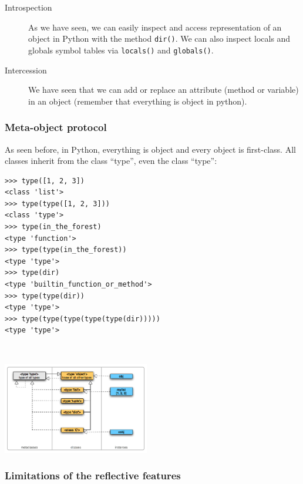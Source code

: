 \documentclass[a4paper,10pt]{article}
\begin{document}
\begin{description}
\item[Introspection] As we have seen, we can easily inspect and access representation of an object in Python with the method \lstinline|dir()|. We can also inspect locals and globals symbol tables via \lstinline|locals()| and \lstinline|globals()|.

\item[Intercession] We have seen that we can add or replace an attribute (method or variable) in an object (remember that everything is object in python).
\end{description}

\subsubsection{Meta-object protocol}

As seen before, in Python, everything is object and every object is first-class. All classes inherit from the class ``type'', even the class ``type'':

\begin{minipage}[c]{.48\linewidth}
\begin{lstlisting}
>>> type([1, 2, 3])
<class 'list'>
>>> type(type([1, 2, 3]))
<class 'type'>
>>> type(in_the_forest)
<type 'function'>
>>> type(type(in_the_forest))
<type 'type'>
>>> type(dir)
<type 'builtin_function_or_method'>
>>> type(type(dir))
<type 'type'>
>>> type(type(type(type(type(dir)))))
<type 'type'>
\end{lstlisting}
~\\
\end{minipage} \hfill
\begin{minipage}[c]{.48\linewidth}
\includegraphics[height=4cm]{typesmap.png}
\end{minipage}




\subsubsection{Limitations of the reflective features}
\end{document}
